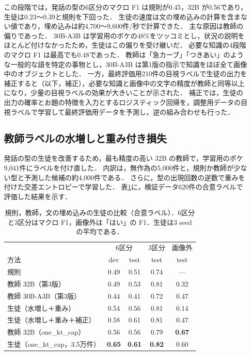 この段階では，発話の型の6区分のマクロ F1 は規則が0.45，32B が0.56であり，生徒は0.23〜0.39と規則を下回った．
生徒の速度は文の埋め込みの計算を含まない値であり，埋め込みは約4,700〜9,600件/秒で計算できた．
主な原因は教師の偏りであった．
30B-A3B は学習用のボケの48\%をツッコミとし，状況の説明をほとんど付けなかったため，生徒はこの偏りを受け継いだ．
必要な知識の4段階のマクロ F1 は最高でも0.48であった．
教師は「急カーブ」「つきあい」のような一般的な語を特定の事物とし，30B-A3B は第1版の指示で知識をほぼ全て画像中のオブジェクトとした．
一方，最終評価用210件の目視ラベルで生徒の出力を補正すると（以下，補正），必要な知識と画像中の文字の精度が教師と同等以上になり，少量の目視ラベルの効果が大きいことが示された．
補正では，生徒の出力の確率とお題の特徴を入力とするロジスティック回帰を，調整用データの目視ラベルで学習して最終評価用データを予測し，逆の組み合わせも行った．

\subsection{教師ラベルの水増しと重み付き損失}
発話の型の生徒を改善するため，最も精度の高い 32B の教師で，学習用のボケ9,041件にラベルを付け直した．
内訳は，無作為の5,000件と，規則か教師が少ない型と予測した候補の約4,000件である．
さらに，型の出現回数の逆数で重みを付けた交差エントロピーで学習した．
表\ref{tab_text_students}に，検証データ620件の合意ラベルで評価した結果を示す．

\begin{table}[t]
    \centering
    \caption{規則，教師，文の埋め込みの生徒の比較（合意ラベル）．6区分と3区分はマクロ F1，画像外は「はい」の F1．生徒は3 seed の平均である．}
    \label{tab_text_students}
    \small
    \begin{tabular}{@{}lcccc@{}}
        \toprule
        & \multicolumn{2}{c}{6区分} & 3区分 & 画像外 \\
        方法 & dev & test & test & test \\
        \midrule
        規則 & 0.49 & 0.51 & 0.74 & --- \\
        教師 32B（第3版） & 0.49 & 0.53 & 0.81 & 0.32 \\
        教師 30B-A3B（第3版） & 0.44 & 0.41 & 0.72 & 0.47 \\
        生徒（水増し＋重み） & 0.54 & 0.56 & 0.81 & 0.14 \\
        生徒（水増し＋重み＋補正） & 0.58 & 0.61 & 0.81 & 0.47 \\
        教師 32B（one\_kt\_cap） & 0.56 & 0.56 & 0.79 & \textbf{0.67} \\
        生徒（one\_kt\_cap，3.5万件） & \textbf{0.65} & \textbf{0.61} & \textbf{0.82} & 0.60 \\
        \bottomrule
    \end{tabular}
\end{table}

